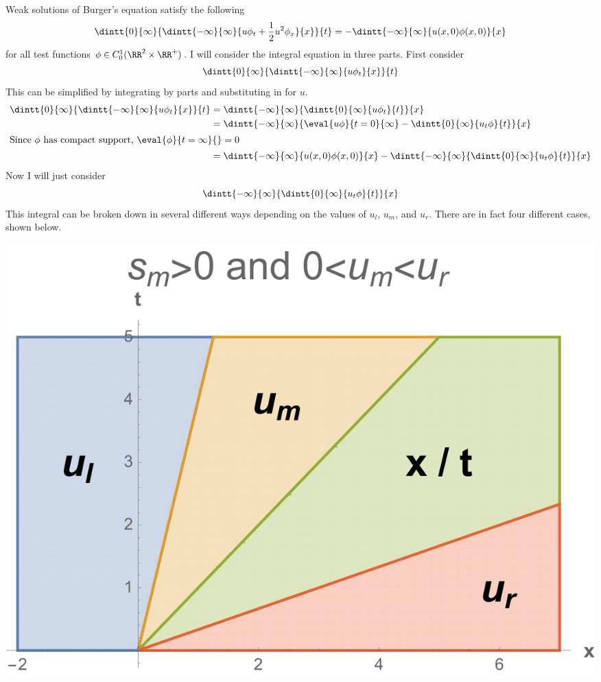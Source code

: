 \documentclass[11pt, oneside]{article}
\begin{document}
\begin{enumerate}
    Weak solutions of Burger's equation satisfy the following
    \[
      \dintt{0}{\infty}{\dintt{-\infty}{\infty}{u \phi_t + \frac{1}{2} u^2 \phi_x}{x}}{t} = -\dintt{-\infty}{\infty}{u(x, 0)\phi(x, 0)}{x}
    \]
    for all test functions $\phi \in C^{1}_0(\RR^2 \times \RR^+)$.
    I will consider the integral equation in three parts.
    First consider
    \[
      \dintt{0}{\infty}{\dintt{-\infty}{\infty}{u \phi_t}{x}}{t}
    \]
    This can be simplified by integrating by parts and substituting in for $u$.
    \begin{align*}
      \dintt{0}{\infty}{\dintt{-\infty}{\infty}{u \phi_t}{x}}{t} &= \dintt{-\infty}{\infty}{\dintt{0}{\infty}{u \phi_t}{t}}{x} \\
      &= \dintt{-\infty}{\infty}{\eval{u \phi}{t = 0}{\infty} - \dintt{0}{\infty}{u_t \phi}{t}}{x} \\
      \intertext{Since $\phi$ has compact support, $\eval{\phi}{t = \infty}{} = 0$}
      &= \dintt{-\infty}{\infty}{u(x, 0) \phi(x,0)}{x} - \dintt{-\infty}{\infty}{\dintt{0}{\infty}{u_t \phi}{t}}{x} \\
    \end{align*}
    Now I will just consider
    \[
      \dintt{-\infty}{\infty}{\dintt{0}{\infty}{u_t \phi}{t}}{x}
    \]
    This integral can be broken down in several different ways depending on the values of $u_l$, $u_m$, and $u_r$.
    There are in fact four different cases, shown below.
    \pagebreak
    \begin{center}
      \includegraphics[scale=.31]{Figures/01_03.pdf} \\

\end{center}
\end{enumerate}
\end{document}
